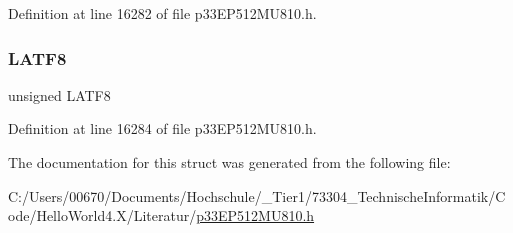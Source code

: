 Definition at line 16282 of file p33\+E\+P512\+M\+U810.\+h.

\mbox{\label{structtag_l_a_t_f_b_i_t_s_a91a8101ef37936d3e787b2c8adccdbbf}} 
\subsubsection{\texorpdfstring{L\+A\+T\+F8}{LATF8}}
{\footnotesize\ttfamily unsigned L\+A\+T\+F8}



Definition at line 16284 of file p33\+E\+P512\+M\+U810.\+h.



The documentation for this struct was generated from the following file\+:\begin{DoxyCompactItemize}
\item 
C\+:/\+Users/00670/\+Documents/\+Hochschule/\+\_\+\+Tier1/73304\+\_\+\+Technische\+Informatik/\+Code/\+Hello\+World4.\+X/\+Literatur/\hyperlink{p33_e_p512_m_u810_8h}{p33\+E\+P512\+M\+U810.\+h}\end{DoxyCompactItemize}

